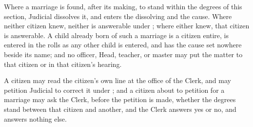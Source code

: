 \begin{setclose}
\begin{clauses}
\item Where a marriage is found, after its making, to stand within the degrees of this section, Judicial dissolves it, and enters the dissolving and the cause. Where neither citizen knew, neither is answerable under ; where either knew, that citizen is answerable. A child already born of such a marriage is a citizen entire, is entered in the rolls as any other child is entered, and has the cause set nowhere beside its name; and no officer, Head, teacher, or master may put the matter to that citizen or in that citizen's hearing.
\item A citizen may read the citizen's own line at the office of the Clerk, and may petition Judicial to correct it under ; and a citizen about to petition for a marriage may ask the Clerk, before the petition is made, whether the degrees stand between that citizen and another, and the Clerk answers yes or no, and answers nothing else.
\end{clauses}
\end{setclose}
